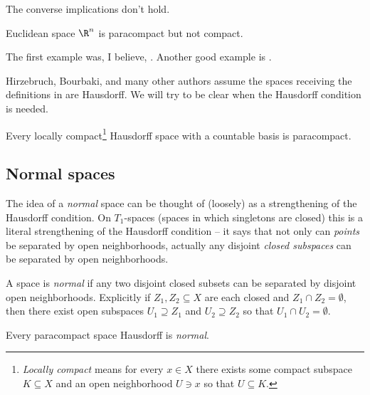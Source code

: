 \documentclass[11pt]{book}
\begin{document}
The converse implications don't hold.

\begin{example} Euclidean space $\R^n$ is paracompact but not compact.
\end{example}

\begin{example} The first example was, I believe, \cite[Example~B]{bingMetrizationTopologicalSpaces1951}. Another good example is \cite[Example~89]{steeinCounterexamplesTopology1978}.
\end{example}

\begin{remark} Hirzebruch, Bourbaki, and many other authors assume the spaces receiving the definitions in  are Hausdorff. We will try to be clear when the Hausdorff condition is needed.
\end{remark}

\begin{theorem} Every locally compact\footnote{\emph{Locally compact} means for every $x\in X$ there exists some compact subspace $K \subseteq X$ and an open neighborhood $U\ni x$ so that $U \subseteq K$.} Hausdorff space with a countable basis is paracompact.
\end{theorem}

\subsection{Normal spaces}

The idea of a \emph{normal} space can be thought of (loosely) as a strengthening of the Hausdorff condition. On $T_1$-spaces (spaces in which singletons are closed) this is a literal strengthening of the Hausdorff condition -- it says that not only can \emph{points} be separated by open neighborhoods, actually any disjoint \emph{closed subspaces} can be separated by open neighborhoods.

\begin{definition}\label{def:normal}
A space is \emph{normal} if any two disjoint closed subsets can be separated by disjoint open neighborhoods. Explicitly if $Z_1,Z_2 \subseteq X$ are each closed and $Z_1 \cap Z_2 = \emptyset$, then there exist open subspaces $U_1 \supseteq Z_1$ and $U_2 \supseteq Z_2$ so that $U_1 \cap U_2 = \emptyset$.
\end{definition}

\begin{theorem} Every paracompact space Hausdorff is \emph{normal}.
\end{theorem}
\end{document}
